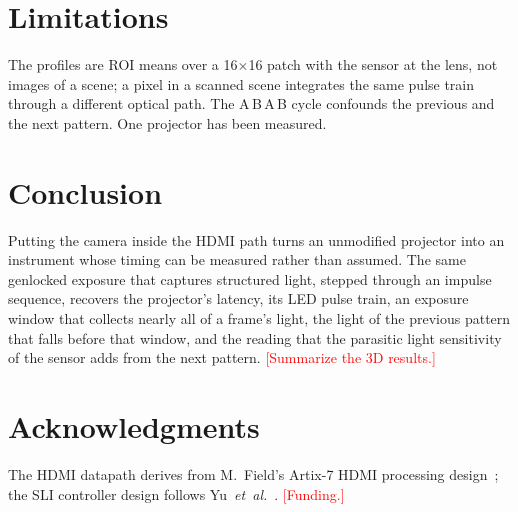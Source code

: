 \documentclass[10pt,journal,compsoc]{IEEEtran}
\newcommand{\pending}[1]{\textcolor{red}{[#1]}}
\begin{document}
\section{Limitations}
\label{sec:limits}
The profiles are ROI means over a 16$\times$16 patch with the sensor at the lens, not images of
a scene; a pixel in a scanned scene integrates the same pulse train through a different optical
path. The A\,B\,A\,B cycle confounds the
previous and the next pattern. One projector has been measured.

\section{Conclusion}
\label{sec:conclusion}
Putting the camera inside the HDMI path turns an unmodified projector into an instrument whose
timing can be measured rather than assumed. The same genlocked exposure that captures
structured light, stepped through an impulse sequence, recovers the projector's latency, its LED
pulse train, an exposure window that collects nearly all of a frame's light, the light of the
previous pattern that falls before that window, and the reading that the parasitic light
sensitivity of the sensor adds from the next pattern. \pending{Summarize the 3D results.}

\section*{Acknowledgments}
The HDMI datapath derives from M.~Field's Artix-7 HDMI processing design~\cite{hamsternz}; the
SLI controller design follows Yu~\emph{et~al.}~\cite{yu2020dualprojector}. \pending{Funding.}



\end{document}
